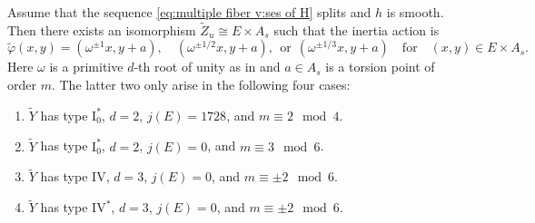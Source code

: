 \documentclass[reqno, letterpaper]{amsart}
\numberwithin{equation}{subsection}
\begin{document}
		\begin{lemma} \label{lem:multiple fiber v:varphi-action smooth}
			Assume that the sequence \eqref{eq:multiple fiber v:ses of H} splits and $h$ is smooth. Then there exists an isomorphism $\tilde Z_u \cong E \times A_s$ such that the inertia action is
			\[ \tilde \varphi(x,y) = (\omega^{\pm 1} x, y + a), \quad (\omega^{\pm 1/2} x, y + a), \ \ \mbox{or} \ \ (\omega^{\pm 1/3} x, y + a) \quad\mbox{for}\quad (x,y) \in E \times A_s .\]
			Here $\omega$ is a primitive $d$-th root of unity as in  and $a \in A_s$ is a torsion point of order $m$. The latter two only arise in the following four cases:
			\begin{enumerate}
				\item $\tilde Y$ has type $\mathrm I_0^*$, $d = 2$, $j(E) = 1728$, and $m \equiv 2 \mod 4$.
				\item $\tilde Y$ has type $\mathrm I_0^*$, $d = 2$, $j(E) = 0$, and $m \equiv 3 \mod 6$.
				\item $\tilde Y$ has type $\mathrm{IV}$, $d = 3$, $j(E) = 0$, and $m \equiv \pm2 \mod 6$.
				\item $\tilde Y$ has type $\mathrm{IV}^*$, $d = 3$, $j(E) = 0$, and $m \equiv \pm2 \mod 6$.
			\end{enumerate}
		\end{lemma}
\end{document}
